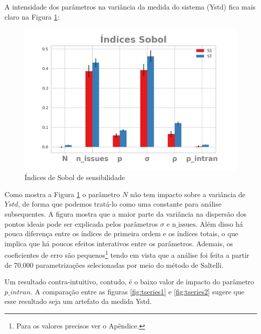 A intensidade dos parâmetros na variância da medida do sistema (Ystd) fica mais
claro na Figura \ref{fig:sobol1}:

\begin{figure}[H]
  \centering
  \includegraphics{ims/barplotmuto5k.png}
  \caption{Índices de Sobol de sensibilidade}
  \label{fig:sobol1}
\end{figure}

Como mostra a Figura \ref{fig:sobol1} o parâmetro \(N\) não tem impacto sobre a
variância de \(Ystd\), de forma que podemos tratá-lo como uma constante para
análise subsequentes. A figura mostra que a maior parte da variância na
dispersão dos pontos ideais pode ser explicada pelos parâmetros \(\sigma\) e
\(\text{n\_issues}\). Além disso há pouca diferença entre os índices de primeira
ordem e os índices totais, o que implica que há poucos efeitos interativos entre
os parâmetros. Ademais, os coeficientes de erro são pequenos\footnote{Para os
  valores precisos ver o Apêndice.} tendo em vista que a análise foi feita a
partir de 70.000 parametrizações selecionadas por meio do método de Saltelli.

Um resultado contra-intuitivo, contudo, é o baixo valor de impacto do parâmetro
\(p\_intran\). A comparação entre as figuras \ref{fig:tseries1} e
\ref{fig:tseries2} sugere que esse resultado seja um artefato da medida Ystd.

